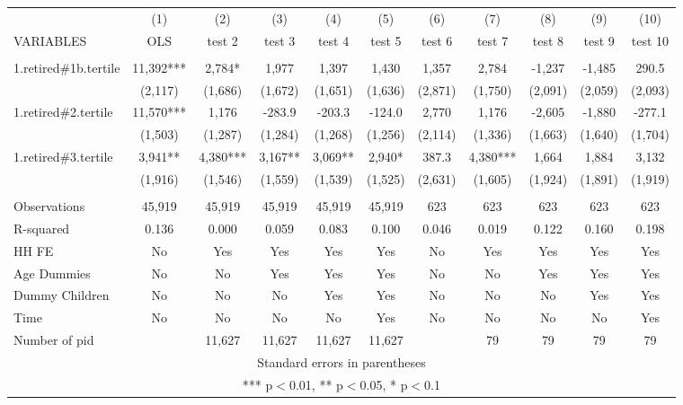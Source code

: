 \begin{tabular}{lcccccccccc} \hline
 & (1) & (2) & (3) & (4) & (5) & (6) & (7) & (8) & (9) & (10) \\
VARIABLES & OLS & test 2 & test 3 & test 4 & test 5 & test 6 & test 7 & test 8 & test 9 & test 10 \\ \hline
 &  &  &  &  &  &  &  &  &  &  \\
1.retired\#1b.tertile & 11,392*** & 2,784* & 1,977 & 1,397 & 1,430 & 1,357 & 2,784 & -1,237 & -1,485 & 290.5 \\
 & (2,117) & (1,686) & (1,672) & (1,651) & (1,636) & (2,871) & (1,750) & (2,091) & (2,059) & (2,093) \\
1.retired\#2.tertile & 11,570*** & 1,176 & -283.9 & -203.3 & -124.0 & 2,770 & 1,176 & -2,605 & -1,880 & -277.1 \\
 & (1,503) & (1,287) & (1,284) & (1,268) & (1,256) & (2,114) & (1,336) & (1,663) & (1,640) & (1,704) \\
1.retired\#3.tertile & 3,941** & 4,380*** & 3,167** & 3,069** & 2,940* & 387.3 & 4,380*** & 1,664 & 1,884 & 3,132 \\
 & (1,916) & (1,546) & (1,559) & (1,539) & (1,525) & (2,631) & (1,605) & (1,924) & (1,891) & (1,919) \\
 &  &  &  &  &  &  &  &  &  &  \\
Observations & 45,919 & 45,919 & 45,919 & 45,919 & 45,919 & 623 & 623 & 623 & 623 & 623 \\
R-squared & 0.136 & 0.000 & 0.059 & 0.083 & 0.100 & 0.046 & 0.019 & 0.122 & 0.160 & 0.198 \\
HH FE & No & Yes & Yes & Yes & Yes & No & Yes & Yes & Yes & Yes \\
Age Dummies & No & No & Yes & Yes & Yes & No & No & Yes & Yes & Yes \\
Dummy Children & No & No & No & Yes & Yes & No & No & No & Yes & Yes \\
Time & No & No & No & No & Yes & No & No & No & No & Yes \\
 Number of pid &  & 11,627 & 11,627 & 11,627 & 11,627 &  & 79 & 79 & 79 & 79 \\ \hline
\multicolumn{11}{c}{ Standard errors in parentheses} \\
\multicolumn{11}{c}{ *** p$<$0.01, ** p$<$0.05, * p$<$0.1} \\
\end{tabular}
